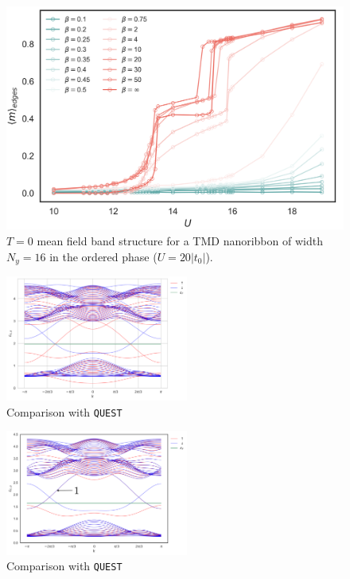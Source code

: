 \begin{figure}[H]
\centering
\includegraphics[scale =0.5]{images/edge-mag-phase-diagram.png}
	\caption[$T=0$ mean field band structure for a TMD nanoribbon of width $N_y = 16$ in the ordered phase, at $U=20 | t_0 |$.]{$T=0$ mean field band structure for a TMD nanoribbon of width $N_y = 16$ in the ordered phase ($U=20 | t_0 |$).}
	\label{fig:bandsZoomed}
\end{figure}

\begin{figure}[H]
  \centering
  \includegraphics[width=6cm]{images/bands_Nx=512.png}
  \caption{Comparison with \texttt{QUEST}}
  \label{fig:blade_flow_pressure}
\end{figure}

\begin{figure}[H]
  \centering
  \includegraphics[width=6cm]{images/bands152.png}
  \caption{Comparison with \texttt{QUEST}}
  \label{fig:blade_flow_pressure}
\end{figure}

